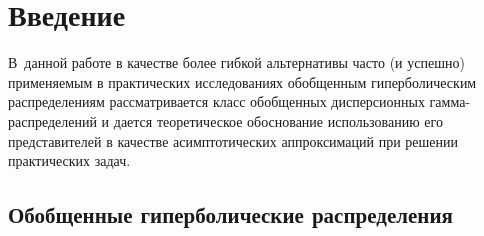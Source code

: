 
      \thispagestyle{headings}

      \begin{multicols}{2}

            \label{st\stat}


\section{Введение}

В~данной работе в качестве более гибкой альтернативы часто (и
успешно) применяемым в практических исследованиях обобщенным
гипер\-бо\-лическим распределениям рассматривается класс обобщенных
дисперсионных гам\-ма-рас\-пре\-де\-ле\-ний и дается теоретическое обоснование
использованию его представителей в качестве асимптотических
аппроксимаций при решении практических задач.

\subsection{Обобщенные гиперболические распределения}


\end{multicols}
